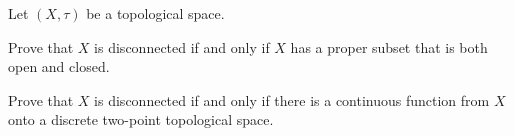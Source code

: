 \begin{comment}
\item From part (a), any two homeomorphic spaces will have the same number of connected components. Now each cut point cuts  L, G, I, S, and N into 2 connected components. But in T, Y, or E we can find cut points that cut the sets into more than 2 connected components. So these two groups form at least two different homeomorphism classes. 

	\begin{itemize}
	\item Any one of L, G, S, or N can be continuously deformed into I by pulling on the endpoints. So these letters all fit into the same class.

	\item We can get any one of T, Y, or E from any other by bending, stretching and contracting, so these letters all fit into the same class. For example, to get from E to T  we unfold the top and bottom arms of the letter E. This makes a T that is stretched horizontally and compressed vertically. By stretching and compressing we can get to the letter T.
	\end{itemize}

\end{itemize}

So the the distinct homeomorphism classes are  $\{O\}$, $\{P\}$, $\{A\}$, $\{L, G, I, S, N\}$, and $\{T, Y, E\}$.  


\end{comment}

\item Let $(X, \tau)$ be a topological space.
\ba
\item Prove that $X$ is disconnected if and only if $X$ has a proper subset that is both open and closed.
\item Prove that $X$ is disconnected if and only if there is a continuous function from $X$ onto a discrete two-point topological space. 
\ea

